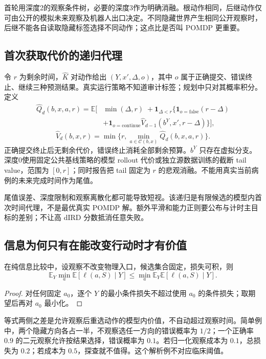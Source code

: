 \documentclass[UTF8,fontset=fandol,11pt,a4paper]{ctexart}
\theoremstyle{plain}
\theoremstyle{definition}
\theoremstyle{remark}
\numberwithin{equation}{section}
\newcommand{\E}{\mathbb E}
\newcommand{\ind}{\mathbf 1}
\begin{document}
首轮用深度2的观察条件树，必要的深度3作为明确消融。根动作相同，后继动作仅可由公开的模拟未来观察及机器人出口决定。不同隐藏世界产生相同公开观察时，后继不能各自读取隐藏标签选择不同动作；这点比是否叫 POMDP 更重要。

\subsection{首次获取代价的递归代理}
令 $r$ 为剩余时间，$\widehat K$ 对动作给出 $(Y,x',\Delta,o)$，其中 $o$ 属于正确提交、错误终止、继续三种预测结果。真实运行策略不知道审计标签；规划中只对其概率积分。定义
\begin{equation}
\begin{split}
\widehat Q_d(b,x,a,r)=\E\big[&\min(\Delta,r)\;+\ind_{\Delta<r}\{\ind_{o=\mathrm{false}}(r-\Delta)\\
&+\ind_{o=\mathrm{continue}}\widehat V_{d-1}(b^Y,x',r-\Delta)\}\big],
\end{split}
\label{eq:bellman}
\end{equation}
\begin{equation}
\widehat V_d(b,x,r)=\min\{r,\min_{a\in\mathcal C(b,x)}\widehat Q_d(b,x,a,r)\}.
\end{equation}
正确提交终止后无剩余代价，错误终止消耗全部剩余预算。$b^Y$ 只存在虚拟分支。深度0使用固定公共基线策略的模型 rollout 代价或独立源数据训练的截断 tail value，范围为 $[0,r]$；同时报告把 tail 固定为 $r$ 的悲观消融。不能用真实当前病例的未来完成时间作为尾值。

尾值误差、深度限制和观察离散化都可能导致短视。该递归是有限候选的模型内首次时间代理，不是最优真实 POMDP 解。额外平滑和能力正则要公布与计时主目标的差别；不让高 dIRD 分数抵消任意失败。

\subsection{信息为何只有在能改变行动时才有价值}
在纯信息比较中，设观察不改变物理入口，候选集合固定，损失可积，则
\begin{equation}
\E_Y\min_a\E[\ell(a,S)\mid Y]\le
\min_a\E_Y\E[\ell(a,S)\mid Y].
\label{eq:recourse}
\end{equation}
\begin{proof}
对任何固定 $a_0$，逐个 $Y$ 的最小条件损失不超过使用 $a_0$ 的条件损失；取期望后再对 $a_0$ 最小化。
\end{proof}

等式两侧之差是允许观察后重选动作的模型内价值，不自动超过观察时间。简单例中，两个隐藏方向各占一半，不观察选任一方向的错误概率为 $1/2$；一个正确率 $0.9$ 的二元观察允许按结果选择，错误概率为 $0.1$。若归一化观察成本为 $0.1$，总损失为 $0.2$；若成本为 $0.5$，探查就不值得。这个解析例不对应临床阈值。
\end{document}
